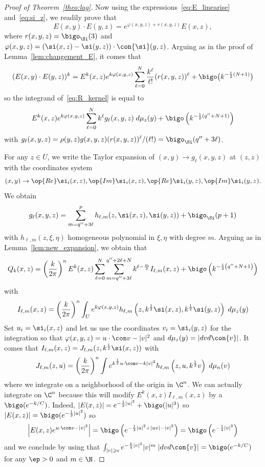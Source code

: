 \begin{proof}[Proof of Theorem~\ref{theo:lag}]
Now using the expressions~\eqref{eq:E_linearise} and~\eqref{eq:si_z}, we readily prove that
\[
E(x,y) \cdot E(y,z) = e^{ \varphi (x,y,z) + r(x,y,z) } E
(x,z),
\]
where $r(x,y,z) = \bigo_{\Si} (3)$ and $ \varphi(x,y,z) = (\si (x,z) - \si (y,z))\cdot \con{\si} (y,z) $. Arguing as in the proof of Lemma~\ref{lem:changement_E}, it comes that
\[
(E(x,y) \cdot E(y,z))^k = E^k(x,z) e^{k \varphi (x,y,z)} \sum_{\ell =0 }^{N}
\frac{k^{\ell}}{\ell !} (r (x,y,z))^{\ell} + \bigo \bigl(k^{-\frac{1}{2} (N+1) } \bigr)
\]
so the integrand of~\eqref{eq:R_kernel} is equal to
\[
E^k(x,z) e^{k \varphi (x,y,z)} \sum_{\ell =0 }^{N}
k^{\ell} g_{\ell} (x,y,z) \; d\mu_z (y) + \bigo \left(k^{-\frac{1}{2} (q'' + N+1)} \right)
\]
with $g_{\ell} (x,y,z) = \rho(y,z) g (x,y,z) (r (x,y,z)) ^\ell / (\ell !) = \bigo_{\Si} (q''+ 3\ell)$.

For any $z \in U$, we write the Taylor expansion of $(x,y) \rightarrow g_{\ell}(x, y,z)$ at $(z,z)$ with the coordinates system
\[
(x,y) \rightarrow \op{Re} \si_i (x,z), \op{Im} \si_i (x,z),
\op{Re} \si_i (y,z), \op{Im} \si_i (y,z).
\]
We obtain
\[
g_\ell(x,y,z) = \sum_{m= q'' + 3 \ell}^{p} h_{\ell,m} (z, \si (x,z), \si (y,z))
+ \bigo_{\Si} (p+1)
\]
with $h_{\ell,m} (z, \xi, \eta)$ homogeneous polynomial in $\xi, \eta$ with degree $m$. Arguing as in Lemma~\ref{lem:new_expansion}, we obtain that
\begin{gather}\label{eq:dev_loc_R}
Q_k (x,z) = \left(\frac{k}{2\pi} \right)^n E^k(x,z) \sum_{\ell= 0}^{N}
\sum_{m= q''+ 3 \ell}^{q''+ 2 \ell +N} k^{\ell - \frac{m}{2}} I_{\ell,m} (x,z) + \bigo \left(k^{-\frac{1}{2} \left(q'' + N+1\right)} \right)
\end{gather}
with
\[
I_{\ell,m} (x,z) = \left(\frac{k}{2\pi} \right)^n \int_U e^{k
\varphi (x,y,z) } h_{\ell,m} \left(z, k^{\frac{1}{2}} \si (x,z), k^{\frac{1}{2}}
\si (y,z)\right) \; d\mu_z (y)
\]
Set $u_i = \si_i (x,z)$ and let us use the coordinates $v_i = \si_i (y,z)$ for the integration so that $\varphi (x,y,z) = u \cdot \con v - |v|^2$ and $d\mu_z (y) = |dv d \con{v}|$. It comes that $ I_{\ell, m} (x,z) = J_{\ell, m} (z, k^{\frac{1}{2}} \si (x,z))$ with
\begin{gather}\label{eq:j_ell_m}
J_{\ell, m } (z, u) = \left(\frac{k}{2\pi} \right)^n \int e^{ k^{\frac{1}{2}} u \cdot \con v - k |v|^2} h_{\ell,m} \left(z, u, k^{\frac{1}{2} } v\right) \; d \mu_n (v)
\end{gather}
where we integrate on a neighborhood of the origin in $\C^n$. We can actually integrate on $\C^n$ because this will modify $E^k(x,z) I_{\ell,m} (x,z)$ by a $\bigo (e^{-k/C})$. Indeed, $| E(x,z) | = e^{-\frac{1}{2} |u|^2} + \bigo (|u|^3)$ so $|E(x,z) | = \bigo (e^{-\frac{1}{3} |u|^2})$ so
\[
\left|E(x,z) e^{u
\cdot \con v - |v|^2}\right| = \bigo \left(e^{ - \frac{1}{3} |u|^2 + |uv| - |v|^2 }\right) = \bigo \left(
e^{ -\frac{1}{4} |v| ^2}\right)
\]
and we conclude by using that $ \int_{|v|\geqslant \epsilon} e^{- \frac{k}{4} |v|^2} |v|^m \; |dv d
\con{v}| = \bigo (e^{-k/C})$ for any $\ep >0$ and $m \in \N$.


\end{proof}
